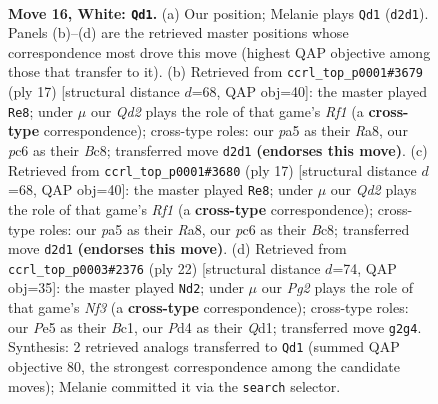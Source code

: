 \documentclass[11pt]{article}
\begin{document}
\clearpage

\begin{figure}[p]\centering
\begin{subfigure}{0.46\textwidth}\centering
\resizebox{\linewidth}{!}{%
\newchessgame
\chessboard[
  setfen={r1bq1rk1/1p1n1ppp/n1p1p3/p2pP3/3P1P2/2N2N2/PPPQ1KPP/2R2B1R w - - 6 16},
  showmover=false,
  pgfstyle=straightmove, color=movearrow, markmove={d2-d1}
]}
\caption{}
\end{subfigure}\hfill
\begin{subfigure}{0.46\textwidth}\centering
\resizebox{\linewidth}{!}{%
\newchessgame
\chessboard[
  setfen={r1bq1rk1/ppp2pp1/2np1n1p/4p3/4P3/P1PP1NP1/2P2PBP/R1BQ1RK1 b - - 0 9},
  showmover=false,
  pgfstyle=straightmove, color=movearrow, markmove={f8-e8}
]}
\caption{}
\end{subfigure}
\\[4pt]
\begin{subfigure}{0.46\textwidth}\centering
\resizebox{\linewidth}{!}{%
\newchessgame
\chessboard[
  setfen={r1bq1rk1/ppp2pp1/2np1n1p/4p3/4P3/P1PP1NP1/2P2PBP/R1BQ1RK1 b - - 0 9},
  showmover=false,
  pgfstyle=straightmove, color=movearrow, markmove={f8-e8}
]}
\caption{}
\end{subfigure}\hfill
\begin{subfigure}{0.46\textwidth}\centering
\resizebox{\linewidth}{!}{%
\newchessgame
\chessboard[
  setfen={r1bq1rk1/p1n2pbp/1p1p1np1/2pP4/P7/2N2NP1/1PP2PBP/R1BQR1K1 w - - 0 12},
  showmover=false,
  pgfstyle=straightmove, color=movearrow, markmove={f3-d2}
]}
\caption{}
\end{subfigure}
\caption{\textbf{Move 16, White: \texttt{Qd1}.} (a) Our position; Melanie plays \texttt{Qd1} (\texttt{d2d1}). Panels (b)--(d) are the retrieved master positions whose correspondence most drove this move (highest QAP objective among those that transfer to it). (b) Retrieved from \texttt{ccrl\_top\_p0001\#3679} (ply 17) [structural distance $d$=68, QAP obj=40]: the master played \texttt{Re8}; under $\mu$ our \emph{Qd2} plays the role of that game's \emph{Rf1} (a \textbf{cross-type} correspondence); cross-type roles: our \emph{p}a5 as their \emph{R}a8, our \emph{p}c6 as their \emph{B}c8; transferred move \texttt{d2d1} \textbf{(endorses this move)}. (c) Retrieved from \texttt{ccrl\_top\_p0001\#3680} (ply 17) [structural distance $d$=68, QAP obj=40]: the master played \texttt{Re8}; under $\mu$ our \emph{Qd2} plays the role of that game's \emph{Rf1} (a \textbf{cross-type} correspondence); cross-type roles: our \emph{p}a5 as their \emph{R}a8, our \emph{p}c6 as their \emph{B}c8; transferred move \texttt{d2d1} \textbf{(endorses this move)}. (d) Retrieved from \texttt{ccrl\_top\_p0003\#2376} (ply 22) [structural distance $d$=74, QAP obj=35]: the master played \texttt{Nd2}; under $\mu$ our \emph{Pg2} plays the role of that game's \emph{Nf3} (a \textbf{cross-type} correspondence); cross-type roles: our \emph{P}e5 as their \emph{B}c1, our \emph{P}d4 as their \emph{Q}d1; transferred move \texttt{g2g4}. Synthesis: 2 retrieved analogs transferred to \texttt{Qd1} (summed QAP objective 80, the strongest correspondence among the candidate moves); Melanie committed it via the \texttt{search} selector.}
\label{fig:thought-m30}
\end{figure}
\end{document}
